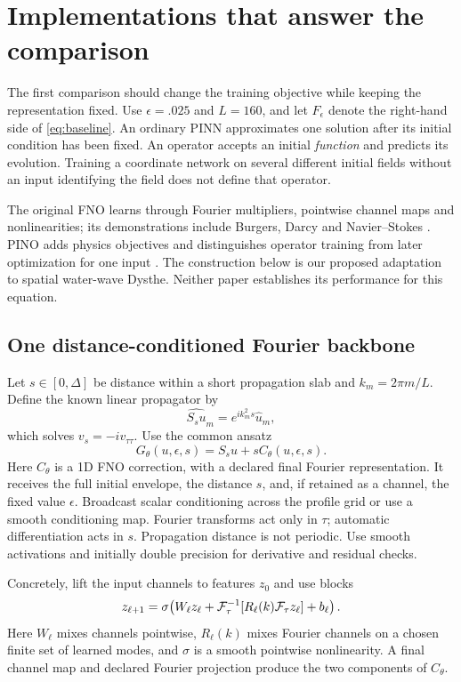 \section{Implementations that answer the comparison}
\label{sec:learning}

The first comparison should change the training objective while keeping
the representation fixed.  Use $\epsilon=.025$ and $L=160$, and let
$F_\epsilon$ denote the right-hand side of \eqref{eq:baseline}.
An ordinary PINN approximates one solution after its initial condition
has been fixed.  An operator accepts an initial \emph{function} and
predicts its evolution.  Training a coordinate network on several
different initial fields without an input identifying the field does not
define that operator.

The original FNO learns through Fourier multipliers, pointwise channel
maps and nonlinearities; its demonstrations include Burgers, Darcy and
Navier--Stokes \cite[\S\S3--5]{fno}.  PINO adds physics objectives and
distinguishes operator training from later optimization for one input
\cite[\S3]{pino}.  The construction below is our proposed adaptation to
spatial water-wave Dysthe.  Neither paper establishes its performance
for this equation.

\subsection{One distance-conditioned Fourier backbone}

Let $s\in[0,\Delta]$ be distance within a short propagation slab and
$k_m=2\pi m/L$.  Define the known linear propagator by
\[
 \widehat{S_su}_m=e^{ik_m^2s}\widehat u_m,
\]
which solves $v_s=-iv_{\tau\tau}$.  Use the common ansatz
\begin{equation}
 G_\theta(u,\epsilon,s)=S_su+sC_\theta(u,\epsilon,s).
 \label{eq:conditioned-fno}
\end{equation}
Here $C_\theta$ is a 1D FNO correction, with a declared final Fourier
representation.  It receives the full initial envelope, the distance
$s$, and, if retained as a channel, the fixed value $\epsilon$.
Broadcast scalar conditioning across the profile grid or use a smooth
conditioning map.  Fourier transforms act only in $\tau$; automatic
differentiation acts in $s$.  Propagation distance is not periodic.
Use smooth activations and initially double precision for derivative
and residual checks.

Concretely, lift the input channels to features $z_0$ and use blocks
\[
z_{\ell+1}=\sigma\!\left(W_\ell z_\ell+
\mathcal F_\tau^{-1}\!\left[R_\ell(k)\mathcal F_\tau z_\ell\right]+b_\ell\right).
\]
Here $W_\ell$ mixes channels pointwise, $R_\ell(k)$ mixes Fourier
channels on a chosen finite set of learned modes, and $\sigma$ is
a smooth pointwise nonlinearity. A final channel map and declared
Fourier projection produce the two components of $C_\theta$.

